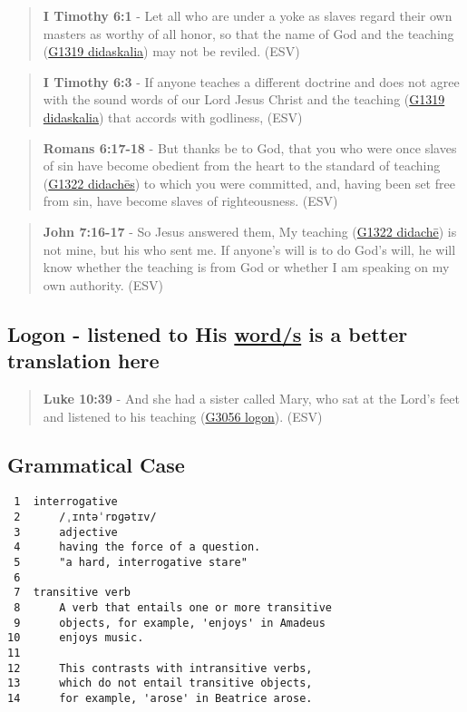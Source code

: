 \documentclass[11pt]{article}
\begin{document}
\begin{quote}
\textbf{I Timothy 6:1} - Let all who are under a yoke as slaves regard their own masters as worthy of all honor, so that the name of God and the teaching (\href{https://biblehub.com/greek/1319.htm}{G1319 didaskalia}) may not be reviled. (ESV)
\end{quote}

\begin{quote}
\textbf{I Timothy 6:3} - If anyone teaches a different doctrine and does not agree with the sound words of our Lord Jesus Christ and the teaching (\href{https://biblehub.com/greek/1319.htm}{G1319 didaskalia}) that accords with godliness, (ESV)
\end{quote}

\begin{quote}
\textbf{Romans 6:17-18} - But thanks be to God, that you who were once slaves of sin have become obedient from the heart to the standard of teaching (\href{https://biblehub.com/greek/1322.htm}{G1322 didachēs}) to which you were committed, and, having been set free from sin, have become slaves of righteousness. (ESV)
\end{quote}

\begin{quote}
\textbf{John 7:16-17} - So Jesus answered them, My teaching (\href{https://biblehub.com/greek/1321.htm}{G1322 didachē}) is not mine, but his who sent me. If anyone's will is to do God's will, he will know whether the teaching is from God or whether I am speaking on my own authority. (ESV)
\end{quote}

\subsection{Logon - listened to His \underline{word/s} is a better translation here}
\label{sec:orgcbfeacf}
\begin{quote}
\textbf{Luke 10:39} - And she had a sister called Mary, who sat at the Lord's feet and listened to his teaching (\href{https://biblehub.com/greek/3056.htm}{G3056 logon}). (ESV)
\end{quote}

\subsection{Grammatical Case}
\label{sec:orgca387db}

\begin{verbatim}
 1  interrogative
 2      /ˌɪntəˈrɒɡətɪv/
 3      adjective
 4      having the force of a question.
 5      "a hard, interrogative stare"
 6  
 7  transitive verb
 8      A verb that entails one or more transitive
 9      objects, for example, 'enjoys' in Amadeus
10      enjoys music.
11  
12      This contrasts with intransitive verbs,
13      which do not entail transitive objects,
14      for example, 'arose' in Beatrice arose.
\end{verbatim}
\end{document}

